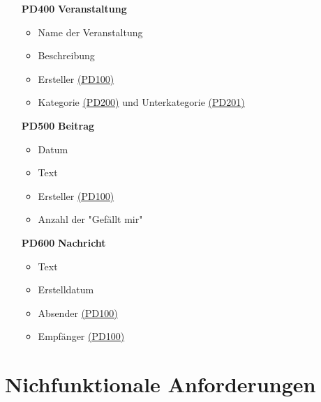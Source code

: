 \documentclass[parskip=full]{scrartcl}
\begin{document}
\begin{itemize}
			\item[\textbf{PD400}] \textbf{Veranstaltung} \label{sec:PD400}
			\begin{itemize}[nosep]
				\item Name der Veranstaltung
				\item Beschreibung
				\item Ersteller \hyperref[sec:PD100]{(PD100)}
				\item \gls{Kategorie} \hyperref[sec:P200]{(PD200)} und \gls{Unterkategorie} \hyperref[sec:PD201]{(PD201)}
			\end{itemize}
			\item[\textbf{PD500}] \textbf{Beitrag} \label{sec:PD500}
			\begin{itemize}[nosep]
				\item Datum
				\item Text
				\item Ersteller \hyperref[sec:PD100]{(PD100)}
				\item Anzahl der "Gefällt mir"
			\end{itemize}
			\item[\textbf{PD600}] \textbf{Nachricht} \label{sec:PD600}
			\begin{itemize}[nosep]
				\item Text
				\item Erstelldatum
				\item Absender \hyperref[sec:PD100]{(PD100)}
				\item Empfänger \hyperref[sec:PD100]{(PD100)}	
			\end{itemize}
		\end{itemize}
		
		\newpage
		\section{Nichfunktionale Anforderungen}
		
\end{document}
